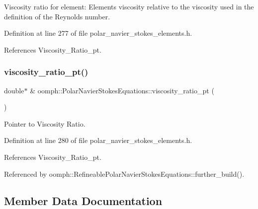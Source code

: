 Viscosity ratio for element\+: Element\textquotesingle{}s viscosity relative to the viscosity used in the definition of the Reynolds number. 



Definition at line 277 of file polar\+\_\+navier\+\_\+stokes\+\_\+elements.\+h.



References Viscosity\+\_\+\+Ratio\+\_\+pt.

\mbox{\label{classoomph_1_1PolarNavierStokesEquations_a86085e439965306219fb225613fab9c0}} 
\subsubsection{\texorpdfstring{viscosity\+\_\+ratio\+\_\+pt()}{viscosity\_ratio\_pt()}}
{\footnotesize\ttfamily double$\ast$ \& oomph\+::\+Polar\+Navier\+Stokes\+Equations\+::viscosity\+\_\+ratio\+\_\+pt (\begin{DoxyParamCaption}{ }\end{DoxyParamCaption})\hspace{0.3cm}{\ttfamily [inline]}}



Pointer to Viscosity Ratio. 



Definition at line 280 of file polar\+\_\+navier\+\_\+stokes\+\_\+elements.\+h.



References Viscosity\+\_\+\+Ratio\+\_\+pt.



Referenced by oomph\+::\+Refineable\+Polar\+Navier\+Stokes\+Equations\+::further\+\_\+build().



\subsection{Member Data Documentation}
\mbox{\label{classoomph_1_1PolarNavierStokesEquations_af11f78588280776bd58d687c63c5dfe4}} 
